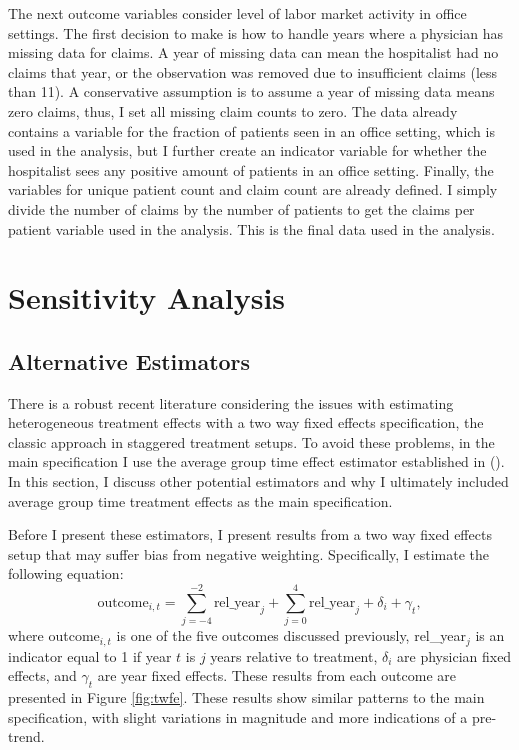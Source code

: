 \documentclass[12pt]{article}
\begin{document}
The next outcome variables consider level of labor market activity in office settings. The first decision to make is how to handle years where a physician has missing data for claims. A year of missing data can mean the hospitalist had no claims that year, or the observation was removed due to insufficient claims (less than 11). A conservative assumption is to assume a year of missing data means zero claims, thus, I set all missing claim counts to zero. The data already contains a variable for the fraction of patients seen in an office setting, which is used in the analysis, but I further create an indicator variable for whether the hospitalist sees any positive amount of patients in an office setting. Finally, the variables for unique patient count and claim count are already defined. I simply divide the number of claims by the number of patients to get the claims per patient variable used in the analysis. This is the final data used in the analysis.

\section{Sensitivity Analysis}

\subsection{Alternative Estimators}\label{app:estimators}

There is a robust recent literature considering the issues with estimating heterogeneous treatment effects with a two way fixed effects specification, the classic approach in staggered treatment setups. To avoid these problems, in the main specification I use the average group time effect estimator established in \citeauthor{callaway2021difference} (\citeyear{callaway2021difference}). In this section, I discuss other potential estimators and why I ultimately included average group time treatment effects as the main specification. 

Before I present these estimators, I present results from a two way fixed effects setup that may suffer bias from negative weighting. Specifically, I estimate the following equation:
$$\text{outcome}_{i,t}=\sum_{j=-4}^{-2} \text{rel\_year}_{j} + \sum_{j=0}^{4} \text{rel\_year}_{j} + \delta_i + \gamma_t,$$
where outcome$_{i,t}$ is one of the five outcomes discussed previously, rel\_year$_j$ is an indicator equal to 1 if year $t$ is $j$ years relative to treatment, $\delta_i$ are physician fixed effects, and $\gamma_t$ are year fixed effects.
These results from each outcome are presented in Figure \ref{fig:twfe}. These results show similar patterns to the main specification, with slight variations in magnitude and more indications of a pre-trend. 
\end{document}
